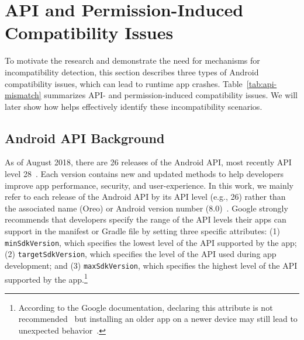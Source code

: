 


\section{API and Permission-Induced Compatibility Issues}\label{sec-background}

To motivate the research and demonstrate the need for
mechanisms for incompatibility detection, this section
describes three types of Android compatibility issues,
which can lead to runtime app crashes.
Table~\ref{tab:api-mismatch} summarizes API- and
permission-induced compatibility issues.  We will later
show how \@approach helps effectively identify these
incompatibility scenarios.




\subsection{Android API Background}

As of August 2018, there are 26 releases of the Android API, most recently
API level 28~\cite{introducingAndroid9}.  Each version contains new and
updated methods to help developers improve app performance, security,
and user-experience. In this work, we mainly refer to each release of
the Android API by its API level (e.g., 26) rather than the associated name 
(Oreo) or Android version number (8.0)~\cite{androidversions}. 
Google strongly recommends that developers specify the range of the API levels
their apps can support in the manifest or Gradle file by setting
three specific attributes: (1) {\tt minSdkVersion}, which specifies the lowest level of the API supported by the app; (2) {\tt targetSdkVersion}, which specifies the level of the API used during app development; and (3) {\tt maxSdkVersion}, which specifies the highest level of the
    API supported by the app.\footnote{According to the Google documentation, declaring this attribute is not
    recommended~\cite{sdkversions} but installing an older app on a newer device
    may still lead to unexpected behavior~\cite{Update4}.}

